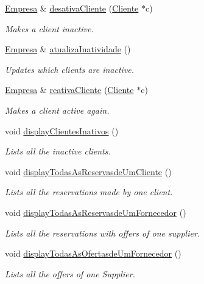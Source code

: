 \begin{DoxyCompactItemize}
\hyperlink{classEmpresa}{Empresa} \& \hyperlink{classEmpresa_a4c8205b2c4aad43f46172966aaed30b7}{desativa\+Cliente} (\hyperlink{classCliente}{Cliente} $\ast$c)
\begin{DoxyCompactList}\small\item\em Makes a client inactive. \end{DoxyCompactList}\item 
\hyperlink{classEmpresa}{Empresa} \& \hyperlink{classEmpresa_aea372dbf680408d9fb32341c03b3e5ad}{atualiza\+Inatividade} ()
\begin{DoxyCompactList}\small\item\em Updates which clients are inactive. \end{DoxyCompactList}\item 
\hyperlink{classEmpresa}{Empresa} \& \hyperlink{classEmpresa_a64b9a495ca3a80380646814557be4924}{reativa\+Cliente} (\hyperlink{classCliente}{Cliente} $\ast$c)
\begin{DoxyCompactList}\small\item\em Makes a client active again. \end{DoxyCompactList}\item 
void \hyperlink{classEmpresa_ac7ea4de24979f6623ffe8fbd3d0eeb24}{display\+Clientes\+Inativos} ()
\begin{DoxyCompactList}\small\item\em Lists all the inactive clients. \end{DoxyCompactList}\item 
void \hyperlink{classEmpresa_a259bb6b172011429c6e24feb0285e66b}{display\+Todas\+As\+Reservasde\+Um\+Cliente} ()
\begin{DoxyCompactList}\small\item\em Lists all the reservations made by one client. \end{DoxyCompactList}\item 
void \hyperlink{classEmpresa_af197726a3dc20739aac877ac4c090f6e}{display\+Todas\+As\+Reservasde\+Um\+Fornecedor} ()
\begin{DoxyCompactList}\small\item\em Lists all the reservations with offers of one supplier. \end{DoxyCompactList}\item 
void \hyperlink{classEmpresa_a73543b5ca1d9dd8e99e75d9167839471}{display\+Todas\+As\+Ofertasde\+Um\+Fornecedor} ()
\begin{DoxyCompactList}\small\item\em Lists all the offers of one Supplier. \end{DoxyCompactList}\item 

\end{DoxyCompactItemize}
